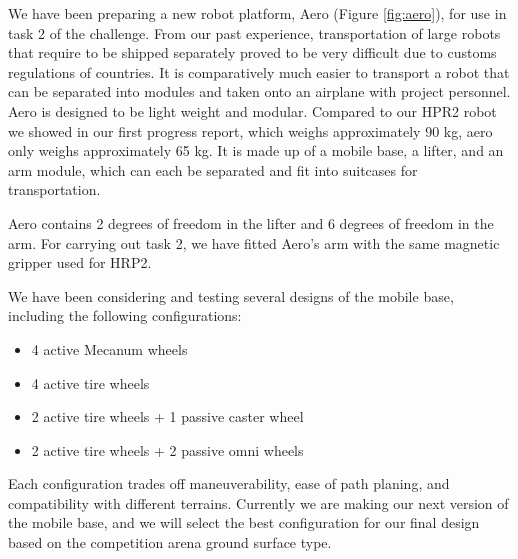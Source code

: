 \documentclass{standalone}
\begin{document}
We have been preparing a new robot platform, Aero (Figure
\ref{fig:aero}), for use in task 2 of the challenge. From our past
experience, transportation of large robots that require to be shipped
separately proved to be very difficult due to customs regulations of
countries. 
It is comparatively much easier to transport a robot that
can be separated into modules and taken onto an airplane with project personnel.
Aero is designed to be light weight and modular. Compared to 
our HPR2 robot we showed in our first progress report, which weighs
approximately 90 kg, aero only weighs approximately 65 kg. It is 
made up of a mobile base, a lifter, and an arm module, which can each 
be separated and fit into suitcases for transportation. 

Aero contains 2 degrees of freedom in the lifter and 6 degrees of freedom in the arm. For carrying out task 2, we have fitted Aero's arm with the same magnetic gripper used for HRP2. 

We have been considering and testing several designs of the mobile base, including the following configurations:
\begin{itemize}
	\item 4 active Mecanum wheels 
	\item 4 active tire wheels
	\item 2 	active tire wheels + 1 passive caster wheel
	\item 2 	active tire wheels + 2 passive omni wheels
\end{itemize}

Each configuration trades off maneuverability, ease of path planing,
and compatibility with different terrains. Currently we are making our
next version of the mobile base, and we will select the best
configuration for our final design based on the competition arena
ground surface type. 
\end{document}
